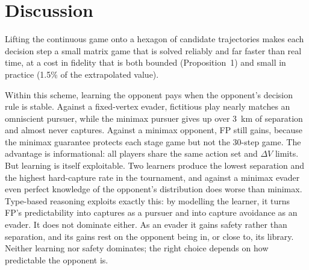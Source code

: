 \documentclass[letterpaper, 10 pt, conference]{ieeeconf}  %
\begin{document}

\section{Discussion}
\label{sec:conclusions}
% 


Lifting the continuous game onto a hexagon of candidate trajectories makes each decision step a small matrix game that is solved reliably and far faster than real time, at a cost in fidelity that is both bounded (Proposition~1) and small in practice (1.5\% of the extrapolated value).

Within this scheme, learning the opponent pays when the opponent's decision rule is stable. Against a fixed-vertex evader, fictitious play nearly matches an omniscient pursuer, while the minimax pursuer gives up over 3~km of separation and almost never captures. Against a minimax opponent, FP still gains, because the minimax guarantee protects each stage game but not the 30-step game. The advantage is informational: all players share the same action set and $\Delta V$ limits. But learning is itself exploitable. Two learners produce the lowest separation and the highest hard-capture rate in the tournament, and against a minimax evader even perfect knowledge of the opponent's distribution does worse than minimax. Type-based reasoning exploits exactly this: by modelling the learner, it turns FP's predictability into captures as a pursuer and into capture avoidance as an evader. It does not dominate either. As an evader it gains safety rather than separation, and its gains rest on the opponent being in, or close to, its library. Neither learning nor safety dominates; the right choice depends on how predictable the opponent is.
\end{document}

